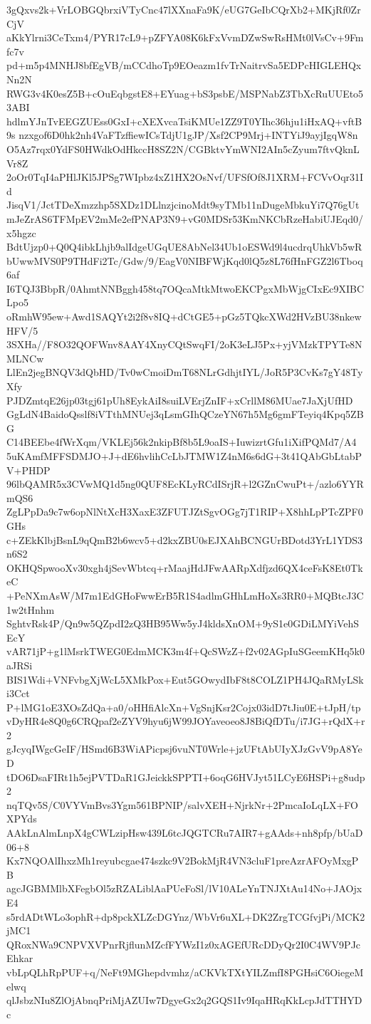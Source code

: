 3gQxvs2k+VrLOBGQbrxiVTyCnc47lXXnaFa9K/eUG7GeIbCQrXb2+MKjRf0ZrCjV
aKkYlrni3CeTxm4/PYR17cL9+pZFYA08K6kFxVvmDZwSwRsHMt0lVsCv+9Fmfc7v
pd+m5p4MNHJ8bfEgVB/mCCdhoTp9EOeazm1fvTrNaitrvSa5EDPcHIGLEHQxNn2N
RWG3v4K0esZ5B+cOuEqbgstE8+EYuag+bS3psbE/MSPNabZ3TbXcRuUUEto53ABI
hdlmYJnTvEEGZUEss0GxI+cXEXvcaTsiKMUe1ZZ9T0YIhc36hju1iHxAQ+vftB9s
nzxgof6D0hk2nh4VaFTzffiewICsTdjU1gJP/Xsf2CP9Mrj+INTYiJ9ayjIgqW8n
O5Az7rqx0YdFS0HWdkOdHkccH8SZ2N/CGBktvYmWNI2AIn5cZyum7ftvQknLVr8Z
2oOr0TqI4aPHlJKl5JPSg7WIpbz4xZ1HX2OsNvf/UFSfOf8J1XRM+FCVvOqr31Id
JisqV1/JctTDeXmzzhp5SXDz1DLlnzjcinoMdt9syTMb11nDugeMbkuYi7Q76gUt
mJeZrAS6TFMpEV2mMe2efPNAP3N9+vG0MDSr53KmNKCbRzeHabiUJEqd0/x5hgzc
BdtUjzp0+Q0Q4ibkLhjb9alIdgeUGqUE8AbNel34Ub1oESWd9l4ucdrqUhkVb5wR
bUwwMVS0P9THdFi2Tc/Gdw/9/EagV0NIBFWjKqd0lQ5z8L76fHnFGZ2l6Tboq6af
I6TQJ3BbpR/0AhmtNNBggh458tq7OQcaMtkMtwoEKCPgxMbWjgCIxEc9XIBCLpo5
oRmhW95ew+Awd1SAQYt2i2f8v8IQ+dCtGE5+pGz5TQkcXWd2HVzBU38nkewHFV/5
3SXHa//F8O32QOFWnv8AAY4XnyCQtSwqFI/2oK3eLJ5Px+yjVMzkTPYTe8NMLNCw
LlEn2jegBNQV3dQbHD/Tv0wCmoiDmT68NLrGdhjtIYL/JoR5P3CvKs7gY48TyXfy
PJDZmtqE26jp03tgj61pUh8EykAiI8suiLVErjZnIF+xCrllM86MUae7JaXjUfHD
GgLdN4BaidoQsslf8iVTthMNUej3qLsmGIhQCzeYN67h5Mg6gmFTeyiq4Kpq5ZBG
C14BEEbe4fWrXqm/VKLEj56k2nkipBf8b5L9oaIS+IuwizrtGfu1iXifPQMd7/A4
5uKAmfMFFSDMJO+J+dE6hvlihCcLbJTMW1Z4nM6s6dG+3t41QAbGbLtabPV+PHDP
96lbQAMR5x3CVwMQ1d5ng0QUF8EcKLyRCdISrjR+l2GZnCwuPt+/azlo6YYRmQS6
ZgLPpDa9c7w6opNlNtXcH3XaxE3ZFUTJZtSgvOGg7jT1RIP+X8hhLpPTcZPF0GHs
c+ZEkKlbjBsnL9qQmB2b6wcv5+d2kxZBU0sEJXAhBCNGUrBDotd3YrL1YDS3n6S2
OKHQSpwooXv30xgh4jSevWbtcq+rMaajHdJFwAARpXdfjzd6QX4ceFsK8Et0TkeC
+PeNXmAsW/M7m1EdGHoFwwErB5R1S4adlmGHhLmHoXs3RR0+MQBtcJ3C1w2tHnhm
SghtvRsk4P/Qn9w5QZpdI2zQ3HB95Ww5yJ4kldsXnOM+9yS1e0GDiLMYiVehSEcY
vAR71jP+g1lMsrkTWEG0EdmMCK3m4f+QcSWzZ+f2v02AGpIuSGeemKHq5k0aJRSi
BIS1Wdi+VNFvbgXjWcL5XMkPox+Eut5GOwydIbF8t8COLZ1PH4JQaRMyLSki3Cct
P+lMG1oE3XOsZdQa+a0/oHHfiAlcXn+VgSnjKsr2Cojx03idD7tJiu0E+tJpH/tp
vDyHR4e8Q0g6CRQpaf2eZYV9hyu6jW99JOYaveoeo8J8BiQfDTu/i7JG+rQdX+r2
gJcyqIWgcGeIF/HSmd6B3WiAPicpsj6vuNT0Wrle+jzUFtAbUIyXJzGvV9pA8YeD
tDO6DsaFIRt1h5ejPVTDaR1GJeickkSPPTI+6oqG6HVJyt51LCyE6HSPi+g8udp2
nqTQv5S/C0VYVmBvs3Ygm561BPNIP/salvXEH+NjrkNr+2PmcaIoLqLX+FOXPYds
AAkLnAlmLnpX4gCWLzipHsw439L6tcJQGTCRu7AIR7+gAAds+nh8pfp/bUaD06+8
Kx7NQOAlIhxzMh1reyubcgae474szkc9V2BokMjR4VN3cluF1preAzrAFOyMxgPB
agcJGBMMlbXFegbOl5zRZALiblAaPUeFoSl/lV10ALeYnTNJXtAu14No+JAOjxE4
s5rdADtWLo3ophR+dp8pckXLZcDGYnz/WbVr6uXL+DK2ZrgTCGfvjPi/MCK2jMC1
QRoxNWa9CNPVXVPnrRjflunMZcfFYWzI1z0xAGEfURcDDyQr2I0C4WV9PJcEhkar
vbLpQLhRpPUF+q/NeFt9MGhepdvmhz/aCKVkTXtYILZmfI8PGHsiC6OiegeMelwq
qlJsbzNIu8ZlOjAbnqPriMjAZUIw7DgyeGx2q2GQS1Iv9IqaHRqKkLcpJdTTHYDc
